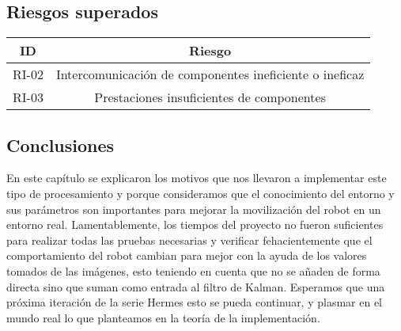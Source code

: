 \subsection{Riesgos superados}
\begin{center}
    \begin{tabular} {
        | c| c |}
        \hline
            ID & Riesgo \\
        \hline
            RI-02 & Intercomunicación de componentes ineficiente o ineficaz \\
        \hline
            RI-03 & Prestaciones insuficientes de componentes \\
        \hline
    \end{tabular}
\end{center}

\subsection{Conclusiones}
En este capítulo se explicaron los motivos que nos llevaron a implementar este tipo de procesamiento y porque consideramos que el conocimiento del entorno y sus parámetros son importantes para mejorar la movilización del robot en un entorno real. Lamentablemente, los tiempos del proyecto no fueron suficientes para realizar todas las pruebas necesarias y verificar fehacientemente que el comportamiento del robot cambian para mejor con la ayuda de los valores tomados de las imágenes, esto teniendo en cuenta que no se añaden de forma directa sino que suman como entrada al filtro de Kalman.
Esperamos que una próxima iteración de la serie Hermes esto se pueda continuar, y plasmar en el mundo real lo que planteamos en la teoría de la implementación.